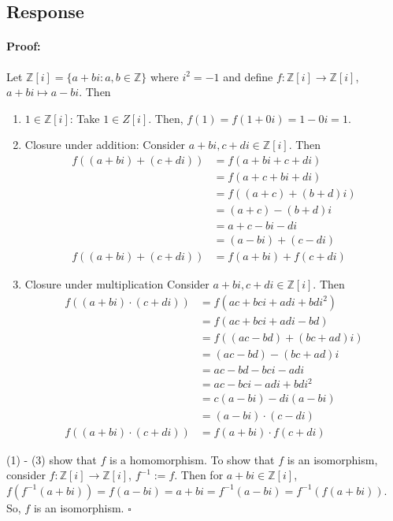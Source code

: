 \documentclass [12pt] {article}
\newcommand{\Z}{\mathbb{Z}}
\newenvironment{proof}{\paragraph{Proof:}}{\hfill$\square$}
\begin{document}
\subsection*{Response}
\begin{proof}
    Let $\Z[i] = \{ a + bi : a, b \in \Z \}$ where $i^2 = -1$ and define $f : \Z[i] \to \Z[i]$, 
    $a + bi \mapsto a - bi$. Then
    \begin{enumerate}
        \item $1 \in \Z[i]$: Take $1 \in Z[i]$. Then, $f(1) = f(1 + 0i) = 1 - 0i = 1$.
        \item Closure under addition: Consider $a + bi, c + di \in \Z[i]$. Then
            \begin{align*}
                f((a + bi) + (c + di)) &= f(a + bi + c + di) \\
                                       &= f(a + c + bi + di) \\
                                       &= f((a + c) + (b + d)i) \\
                                       &= (a + c) - (b + d)i \\
                                       &= a + c - bi - di \\
                                       &= (a - bi) + (c - di) \\
                f((a + bi) + (c + di)) &= f(a + bi) + f(c + di)
            \end{align*}

        \item Closure under multiplication Consider $a + bi, c + di \in \Z[i]$. Then
            \begin{align*}
                f((a + bi) \cdot (c + di)) &= f(ac + bci + adi + bdi^2) \\
                                       &= f(ac + bci + adi - bd) \\
                                       &= f((ac - bd) + (bc + ad)i) \\
                                       &= (ac - bd) - (bc + ad)i \\
                                       &= ac - bd - bci - adi \\
                                       &= ac - bci - adi + bdi^2 \\
                                       &= c(a - bi) - di(a - bi) \\
                                       &= (a - bi) \cdot (c - di) \\
                f((a + bi) \cdot (c + di)) &= f(a + bi) \cdot f(c + di)
            \end{align*}
    \end{enumerate}
    (1) - (3) show that $f$ is a homomorphism. To show that $f$ is an isomorphism, consider
    $f : \Z[i] \to \Z[i]$, $f^{-1} := f$. Then for $a + bi \in \Z[i]$, 
    $f(f^{-1}(a + bi)) = f(a - bi) = a + bi = f^{-1}(a - bi) = f^{-1}(f(a + bi))$. So, $f$ is an
    isomorphism.
\end{proof}
\newpage
\end{document}
